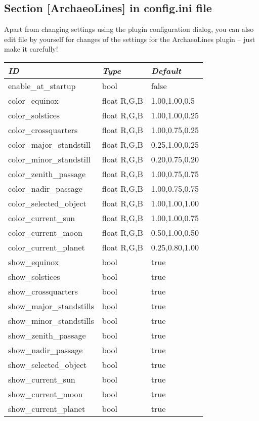 \subsection*{Section [ArchaeoLines] in config.ini file}

Apart from changing settings using the plugin configuration dialog,
you can also edit  file by yourself for changes of the
settings for the ArchaeoLines plugin -- just make it carefully!

\begin{longtabu} {l|l|l}\toprule
\emph{ID}                   &\emph{Type} & \emph{Default}  \\\midrule
enable\_at\_startup         &bool        & false           \\\midrule
color\_equinox              &float R,G,B & 1.00,1.00,0.5   \\\midrule
color\_solstices            &float R,G,B & 1.00,1.00,0.25  \\\midrule
color\_crossquarters        &float R,G,B & 1.00,0.75,0.25  \\\midrule
color\_major\_standstill    &float R,G,B & 0.25,1.00,0.25  \\\midrule
color\_minor\_standstill    &float R,G,B & 0.20,0.75,0.20  \\\midrule
color\_zenith\_passage      &float R,G,B & 1.00,0.75,0.75  \\\midrule
color\_nadir\_passage       &float R,G,B & 1.00,0.75,0.75  \\\midrule
color\_selected\_object     &float R,G,B & 1.00,1.00,1.00  \\\midrule
color\_current\_sun         &float R,G,B & 1.00,1.00,0.75  \\\midrule
color\_current\_moon        &float R,G,B & 0.50,1.00,0.50  \\\midrule
color\_current\_planet      &float R,G,B & 0.25,0.80,1.00  \\\midrule
show\_equinox               &bool        & true  \\\midrule
show\_solstices             &bool        & true  \\\midrule
show\_crossquarters         &bool        & true  \\\midrule
show\_major\_standstills    &bool        & true  \\\midrule
show\_minor\_standstills    &bool        & true  \\\midrule
show\_zenith\_passage       &bool        & true  \\\midrule
show\_nadir\_passage        &bool        & true  \\\midrule
show\_selected\_object      &bool        & true  \\\midrule
show\_current\_sun          &bool        & true  \\\midrule
show\_current\_moon         &bool        & true  \\\midrule
show\_current\_planet       &bool        & true  \\\bottomrule
\end{longtabu}


